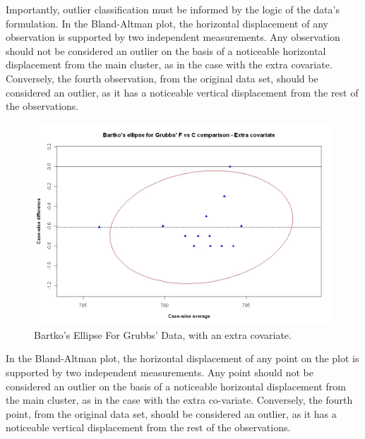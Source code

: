 \documentclass[Main.tex]{subfiles}
\begin{document}
	
	
	Importantly, outlier classification must be informed by the logic of the
	data's formulation. In the Bland-Altman plot, the horizontal displacement of any observation is supported by two independent measurements. Any observation should not be considered an outlier on the basis of a noticeable horizontal displacement from the main cluster, as in the case with the extra covariate. Conversely, the fourth observation, from the original data set, should be considered an outlier, as it has a noticeable vertical displacement from the
	rest of the observations.

	
	\begin{figure}[h!]
		\includegraphics[width=130mm]{images/GrubbsBartko2.jpeg}
		\caption{Bartko's Ellipse For Grubbs' Data, with an extra covariate.}\label{GrubbsBartko2}
	\end{figure}
	
	In the Bland-Altman plot, the horizontal displacement of any point on the plot is supported by two independent measurements. Any point should not be considered an outlier on the basis of a noticeable horizontal displacement from the main cluster, as in the case with the extra co-variate. Conversely, the fourth point, from the original data set, should be considered an
	outlier, as it has a noticeable vertical displacement from the rest of the observations.
\end{document}
